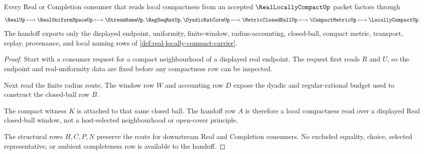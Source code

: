 \begin{theorem}
\label{thm:real-locally-compact-handoff}
Every Real or Completion consumer that reads local compactness from an accepted $\RealLocallyCompactUp$ packet factors through
$$
\RealUp \longmapsto \RealUniformSpaceUp \longmapsto \StreamNameUp,\RegSeqRatUp,\DyadicRatCoreUp \longmapsto \MetricClosedBallUp \longmapsto \CompactMetricUp \longmapsto \LocallyCompactUp .
$$
The handoff exports only the displayed endpoint, uniformity, finite-window, radius-accounting, closed-ball, compact metric, transport, replay, provenance, and local naming rows of \autoref{def:real-locally-compact-carrier}.
\end{theorem}
\begin{proof}
Start with a consumer request for a compact neighbourhood of a displayed real endpoint. The request first reads $R$ and $U$, so the endpoint and real-uniformity data are fixed before any compactness row can be inspected.

Next read the finite radius route. The window row $W$ and accounting row $D$ expose the dyadic and regular-rational budget used to construct the closed-ball row $B$.

The compact witness $K$ is attached to that same closed ball. The handoff row $A$ is therefore a local compactness read over a displayed Real closed-ball window, not a host-selected neighbourhood or open-cover principle.

The structural rows $H,C,P,N$ preserve the route for downstream Real and Completion consumers. No excluded equality, choice, selected representative, or ambient completeness row is available to the handoff.
\end{proof}


\begin{closurestatus}{\RealLocallyCompactUp}
  \theoryclosure{\seedClosure}
  \formalstatus{\unformalizedV}
\end{closurestatus}
